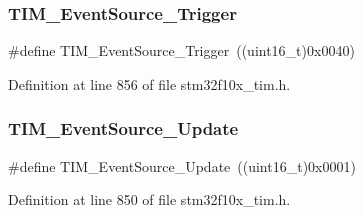 \subsubsection{\texorpdfstring{T\+I\+M\+\_\+\+Event\+Source\+\_\+\+Trigger}{TIM\_EventSource\_Trigger}}
{\footnotesize\ttfamily \#define T\+I\+M\+\_\+\+Event\+Source\+\_\+\+Trigger~((uint16\+\_\+t)0x0040)}



Definition at line 856 of file stm32f10x\+\_\+tim.\+h.

\mbox{\label{group___t_i_m___event___source_ga5bff72fbe94b1ae5a710e402c9868b23}} 
\subsubsection{\texorpdfstring{T\+I\+M\+\_\+\+Event\+Source\+\_\+\+Update}{TIM\_EventSource\_Update}}
{\footnotesize\ttfamily \#define T\+I\+M\+\_\+\+Event\+Source\+\_\+\+Update~((uint16\+\_\+t)0x0001)}



Definition at line 850 of file stm32f10x\+\_\+tim.\+h.

